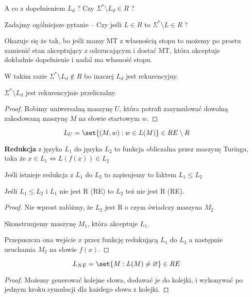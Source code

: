 A co z dopełnieniem \( L_d \) ? Czy \( \Sigma^* \setminus L_d \in R \) ? 

Zadajmy ogólniejsze pytanie -- Czy jeśli \( L \in R \) to \( \Sigma^* \setminus L \in R \) ? 

Okazuje się że tak, bo jeśli mamy MT z własnością  stopu to możemy po prostu zamienić stan akceptujący z odrzucającym i dostać MT, która akceptuje dokładnie dopełnienie i nadal ma własność stopu.

W takim razie \( \Sigma^* \setminus L_d \notin R \) bo inaczej \( L_d \) jest rekurencyjny.

\begin{lemma}
    \( \Sigma^* \setminus L_d \) jest rekurencyjnie przeliczalny.
\end{lemma}
\begin{proof}
    Robimy uniwersalną maszynę \( U \), która potrafi zasymulować dowolną zakodowaną maszynę \( M \) na słowie startowym \( w \).
\end{proof}

\begin{lemma}
    \[
        L_U = \set{(M, w) : w \in L(M)} \in RE \setminus R
    \]
\end{lemma}

\begin{definition}
    \textbf{Redukcja} z języka \( L_1 \) do języka \( L_2 \) to funkcja obliczalna przez maszynę Turinga, taka że \( x \in L_1 \iff L(f(x)) \in L_2 \)
    
    Jeśli istnieje redukcja z \( L_1 \) do \( L_2 \) to zapisujemy to faktem \( L_1 \leq L_2 \)
\end{definition}

\begin{lemma}
    Jeśli \( L_1 \leq L_2 \) i \( L_1 \) nie jest R (RE) to \( L_2 \) też nie jest R (RE).
\end{lemma}
\begin{proof}
    Nie wprost załóżmy, że \( L_2 \) jest R o czym świadczy maszyna \( M_2 \)
    
    Skonstruujemy maszynę \( M_1 \), która akceptuje \( L_1 \).
    
    Przepuszcza ona wejście \( x \) przez funkcję redukującą \( L_1 \) do \( L_2\) a następnie uruchamia \( M_2 \) na słowie \( f(x) \).
\end{proof}

\begin{lemma}
    \[
        L_{NE} = \set{ M : L(M) \neq \varnothing } \in RE
    \]
\end{lemma}
\begin{proof}
    Możemy generować kolejne słowa, dodawać je do kolejki, i wykonywać po jednym kroku symulacji dla każdego słowa z kolejki.
\end{proof}

